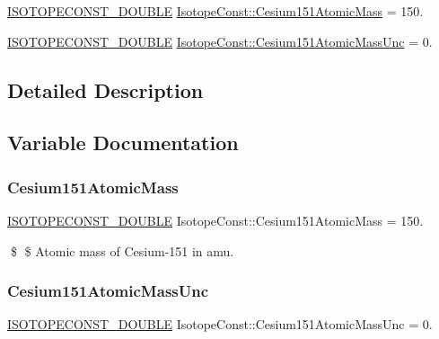 \begin{DoxyCompactItemize}
\item 
\mbox{\hyperlink{group___isotope_const-_macros_ga8f45a7272ce02c0b4c65c44636ed719a}{I\+S\+O\+T\+O\+P\+E\+C\+O\+N\+S\+T\+\_\+\+D\+O\+U\+B\+LE}} \mbox{\hyperlink{group___isotope_const-_cesium-_cs151_gace404d20e4140a8cc605a3d5e45266cc}{Isotope\+Const\+::\+Cesium151\+Atomic\+Mass}} = 150.
\item 
\mbox{\hyperlink{group___isotope_const-_macros_ga8f45a7272ce02c0b4c65c44636ed719a}{I\+S\+O\+T\+O\+P\+E\+C\+O\+N\+S\+T\+\_\+\+D\+O\+U\+B\+LE}} \mbox{\hyperlink{group___isotope_const-_cesium-_cs151_ga4fa080b872cb9b0291db85f8b5224498}{Isotope\+Const\+::\+Cesium151\+Atomic\+Mass\+Unc}} = 0.
\end{DoxyCompactItemize}


\subsection{Detailed Description}


\subsection{Variable Documentation}
\mbox{\label{group___isotope_const-_cesium-_cs151_gace404d20e4140a8cc605a3d5e45266cc}} 
\subsubsection{\texorpdfstring{Cesium151\+Atomic\+Mass}{Cesium151AtomicMass}}
{\footnotesize\ttfamily \mbox{\hyperlink{group___isotope_const-_macros_ga8f45a7272ce02c0b4c65c44636ed719a}{I\+S\+O\+T\+O\+P\+E\+C\+O\+N\+S\+T\+\_\+\+D\+O\+U\+B\+LE}} Isotope\+Const\+::\+Cesium151\+Atomic\+Mass = 150.}

\$ \$ Atomic mass of Cesium-\/151 in amu. \mbox{\label{group___isotope_const-_cesium-_cs151_ga4fa080b872cb9b0291db85f8b5224498}} 
\subsubsection{\texorpdfstring{Cesium151\+Atomic\+Mass\+Unc}{Cesium151AtomicMassUnc}}
{\footnotesize\ttfamily \mbox{\hyperlink{group___isotope_const-_macros_ga8f45a7272ce02c0b4c65c44636ed719a}{I\+S\+O\+T\+O\+P\+E\+C\+O\+N\+S\+T\+\_\+\+D\+O\+U\+B\+LE}} Isotope\+Const\+::\+Cesium151\+Atomic\+Mass\+Unc = 0.}


